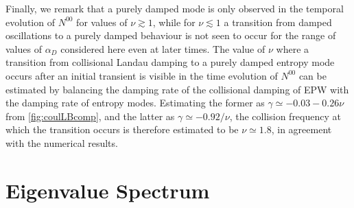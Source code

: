 {Finally, we remark that a purely damped mode is only observed in the temporal evolution of $N^{00}$ for values of $\nu \gtrsim 1$, while for $\nu \lesssim 1$ a transition from damped oscillations to a purely damped behaviour is not seen to occur for the range of values of $\alpha_D$ considered here even at later times.
%
The value of $\nu$ where a transition from collisional Landau damping to a purely damped entropy mode occurs after an initial transient is visible in the time evolution of $N^{00}$ can be estimated by balancing the damping rate of the collisional damping of EPW with the damping rate of entropy modes.
%
Estimating the former as $\gamma \simeq -0.03-0.26 \nu$ from \cref{fig:coulLBcomp}, and the latter as $\gamma \simeq -0.92/\nu$, the collision frequency at which the transition occurs is therefore estimated to be $\nu \simeq 1.8$, in agreement with the numerical results.
}

\section{Eigenvalue Spectrum}
\label{sec:eigspec}

